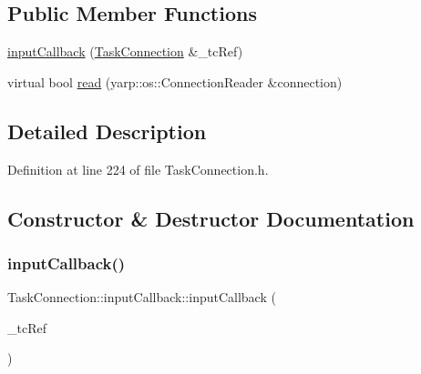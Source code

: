 \subsection*{Public Member Functions}
\begin{DoxyCompactItemize}
\item 
\hyperlink{classocra__recipes_1_1TaskConnection_1_1inputCallback_a98ccd226e21cf3e6547689739bc88c8d}{input\+Callback} (\hyperlink{classocra__recipes_1_1TaskConnection}{Task\+Connection} \&\+\_\+tc\+Ref)
\item 
virtual bool \hyperlink{classocra__recipes_1_1TaskConnection_1_1inputCallback_a6572ca3aa11c347ecd414ea760ae89bc}{read} (yarp\+::os\+::\+Connection\+Reader \&connection)
\end{DoxyCompactItemize}


\subsection{Detailed Description}


Definition at line 224 of file Task\+Connection.\+h.



\subsection{Constructor \& Destructor Documentation}
\hypertarget{classocra__recipes_1_1TaskConnection_1_1inputCallback_a98ccd226e21cf3e6547689739bc88c8d}{}\label{classocra__recipes_1_1TaskConnection_1_1inputCallback_a98ccd226e21cf3e6547689739bc88c8d} 
\subsubsection{\texorpdfstring{input\+Callback()}{inputCallback()}}
{\footnotesize\ttfamily Task\+Connection\+::input\+Callback\+::input\+Callback (\begin{DoxyParamCaption}\item[{\hyperlink{classocra__recipes_1_1TaskConnection}{Task\+Connection} \&}]{\+\_\+tc\+Ref }\end{DoxyParamCaption})}



